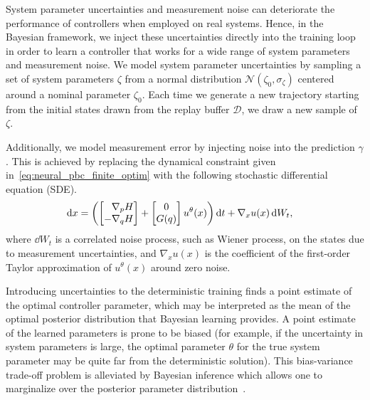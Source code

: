 

System parameter uncertainties and measurement noise can deteriorate the
performance of controllers when employed on real systems. 
%
Hence, in the Bayesian framework, we inject these uncertainties directly into
the training loop in order to learn a controller that works for a wide range of
system parameters and measurement noise.
%
We model system parameter uncertainties by sampling a set of system parameters
$\zeta$ from a normal distribution $\mathcal{N}(\zeta_0, \sigma_{\zeta})$
centered around a nominal parameter $\zeta_0$.
%
Each time we generate a new trajectory starting from the initial states drawn
from the replay buffer $\mathcal{D}$, we draw a new sample of $\zeta$.
%


Additionally, we model measurement error by injecting noise into the prediction
$\gamma$.
%
This is achieved by replacing the dynamical constraint given
in~\eqref{eq:neural_pbc_finite_optim} with the following stochastic differential
equation (SDE).
\begin{align}
    \operatorname{d}\! x &= \left(\begin{bmatrix}\phantom{-}\nabla_p H \\-\nabla_q H\end{bmatrix} + \begin{bmatrix}0 \\ G(q)\end{bmatrix}u^{\theta}(x) \right) \operatorname{d}\! t + \nabla_x u(x) \operatorname{d}\! W_t, 
    \label{eq:sde_initial}
\end{align}
where $\dd W_t$ is a correlated noise process, such as Wiener process, on the
states due to measurement uncertainties, and $\nabla_x u(x)$ is the coefficient
of the first-order Taylor approximation of $u^{\theta}(x)$ around zero noise. 
  
\begin{rem}
    Introducing uncertainties to the deterministic training finds a point
    estimate of the optimal controller parameter, which may be interpreted
    as the mean of the optimal posterior distribution that Bayesian learning
    provides. A point estimate of the learned parameters is prone to be
    biased (for example, if the uncertainty in system parameters is large,
    the optimal parameter $\theta$ for the true system parameter may be
    quite far from the deterministic solution). This bias-variance trade-off
    problem is alleviated by Bayesian inference which allows one to
    marginalize over the posterior parameter
    distribution~\cite{bishop2006pattern}.
\end{rem}  


